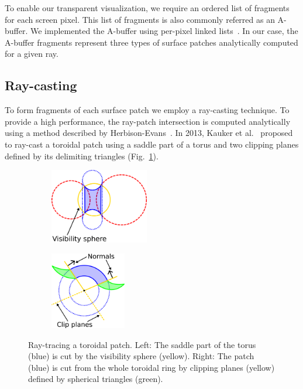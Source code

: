 \label{sec:vis}

To enable our transparent visualization, we require an ordered list of fragments for each screen pixel. This list of fragments is also commonly referred as an A-buffer. We implemented the A-buffer using per-pixel linked lists~\cite{yang2010real}. In our case, the A-buffer fragments represent three types of surface patches analytically computed for a given ray.

\subsection{Ray-casting}
\label{sec:spherical-patches}
To form fragments of each surface patch we employ a ray-casting technique. To provide a high performance, the ray-patch intersection is computed analytically using a method described by Herbison-Evans~\cite{herbisonevans1995solving}.
In 2013, Kauker et al.~\cite{kauker2013rendering} proposed to ray-cast a toroidal patch using a saddle part of a torus and two clipping planes defined by its delimiting triangles (Fig.~\ref{fig:torus}).
\begin{figure}[htp]
  \centering
  \begin{subfigure}[t]{0.55\columnwidth}
    \centering
    \includegraphics[width=1.7in]{image/torus-vs.png}
  \end{subfigure}%
  \quad
  \begin{subfigure}[t]{0.4\columnwidth}
    \centering
    \includegraphics[width=1.3in]{image/torus-planes.png}
  \end{subfigure}
	\caption{Ray-tracing a toroidal patch. Left: The saddle part of the torus (blue) is cut by the visibility sphere (yellow).
Right: The patch (blue) is cut from the whole toroidal ring by clipping planes (yellow) defined by spherical triangles (green).}
	\label{fig:torus}
\end{figure}

